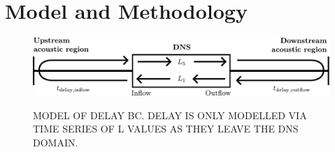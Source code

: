 \section{Model and Methodology}



\begin{figure}[t]
\centering
\includegraphics[scale=0.65]{assets/imgs/delay_bc_model.pdf}
\label{fig:delay-model}
\caption{MODEL OF DELAY BC. DELAY IS ONLY MODELLED VIA TIME SERIES OF L VALUES AS THEY LEAVE THE DNS DOMAIN.}
\end{figure}

